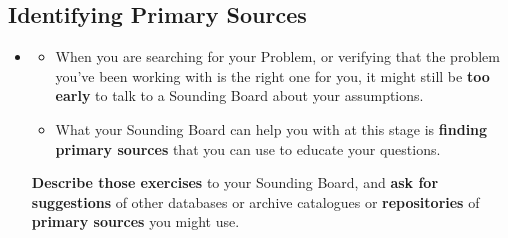\documentclass[11pt]{article}
\begin{document}
\subsection{Identifying Primary Sources}
\begin{itemize}
\item  \begin{exercise}
\begin{itemize}
\item When you are searching for your Problem, or verifying that the problem you’ve been working with is the right one for you, it might still be \textbf{too early} to talk to a Sounding Board about your assumptions. 

\item What your Sounding Board can help you with at this stage is \textbf{finding primary sources} that you can use to educate your questions. 
\end{itemize}

\textbf{Describe those exercises} to your Sounding Board, and \textbf{ask for suggestions} of other databases or archive catalogues or \textbf{repositories} of \textbf{primary sources} you might use.
\end{exercise}
\end{itemize}
\end{document}
